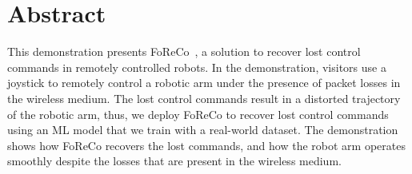 \documentclass[a0,portrait]{a0poster}
\begin{document}
\section*{Abstract}
This demonstration presents FoReCo~\cite{foreco},
    a solution to recover lost control
    commands in remotely controlled
    robots. In the demonstration,
    visitors use a joystick to remotely
    control a robotic arm under the
    presence of packet losses in the wireless medium. The lost
    control commands result in a distorted trajectory of the robotic arm,
    thus, we deploy
    FoReCo to recover lost
    control commands using an ML model
    that we train with a real-world dataset. The demonstration shows how FoReCo recovers the lost commands, and how the robot arm operates smoothly despite the losses that are present in the wireless medium.



\end{document}
